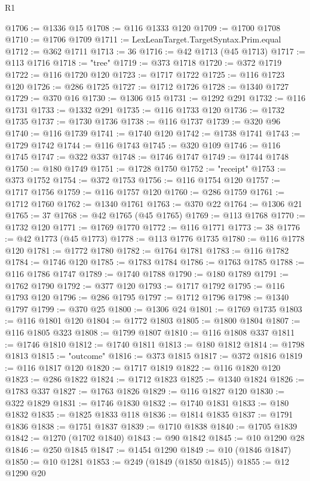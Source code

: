 \begin{lexlean}{R1}
\begin{coremodule}
@1706 := @1336 @15
@1708 := @116 @1333 @120
@1709 := @1700 @1708
@1710 := @1706 @1709
@1711 := LexLeanTarget.TargetSyntax.Prim.equal
@1712 := @362 @1711
@1713 := 36
@1716 := @42 @1713 (@45 @1713)
@1717 := @113 @1716
@1718 := "tree"
@1719 := @373 @1718
@1720 := @372 @1719
@1722 := @116 @1720 @120
@1723 := @1717 @1722
@1725 := @116 @1723 @120
@1726 := @286 @1725
@1727 := @1712 @1726
@1728 := @1340 @1727
@1729 := @370 @16
@1730 := @1306 @15
@1731 := @1292 @291
@1732 := @116 @1731
@1733 := @1332 @291
@1735 := @116 @1733 @120
@1736 := @1732 @1735
@1737 := @1730 @1736
@1738 := @116 @1737
@1739 := @320 @96
@1740 := @116 @1739
@1741 := @1740 @120
@1742 := @1738 @1741
@1743 := @1729 @1742
@1744 := @116 @1743
@1745 := @320 @109
@1746 := @116 @1745
@1747 := @322 @337
@1748 := @1746 @1747
@1749 := @1744 @1748
@1750 := @180 @1749
@1751 := @1728 @1750
@1752 := "receipt"
@1753 := @373 @1752
@1754 := @372 @1753
@1756 := @116 @1754 @120
@1757 := @1717 @1756
@1759 := @116 @1757 @120
@1760 := @286 @1759
@1761 := @1712 @1760
@1762 := @1340 @1761
@1763 := @370 @22
@1764 := @1306 @21
@1765 := 37
@1768 := @42 @1765 (@45 @1765)
@1769 := @113 @1768
@1770 := @1732 @120
@1771 := @1769 @1770
@1772 := @116 @1771
@1773 := 38
@1776 := @42 @1773 (@45 @1773)
@1778 := @113 @1776 @1735
@1780 := @116 @1778 @120
@1781 := @1772 @1780
@1782 := @1764 @1781
@1783 := @116 @1782
@1784 := @1746 @120
@1785 := @1783 @1784
@1786 := @1763 @1785
@1788 := @116 @1786 @1747
@1789 := @1740 @1788
@1790 := @180 @1789
@1791 := @1762 @1790
@1792 := @377 @120
@1793 := @1717 @1792
@1795 := @116 @1793 @120
@1796 := @286 @1795
@1797 := @1712 @1796
@1798 := @1340 @1797
@1799 := @370 @25
@1800 := @1306 @24
@1801 := @1769 @1735
@1803 := @116 @1801 @120
@1804 := @1772 @1803
@1805 := @1800 @1804
@1807 := @116 @1805 @323
@1808 := @1799 @1807
@1810 := @116 @1808 @337
@1811 := @1746 @1810
@1812 := @1740 @1811
@1813 := @180 @1812
@1814 := @1798 @1813
@1815 := "outcome"
@1816 := @373 @1815
@1817 := @372 @1816
@1819 := @116 @1817 @120
@1820 := @1717 @1819
@1822 := @116 @1820 @120
@1823 := @286 @1822
@1824 := @1712 @1823
@1825 := @1340 @1824
@1826 := @1783 @337
@1827 := @1763 @1826
@1829 := @116 @1827 @120
@1830 := @322 @1829
@1831 := @1746 @1830
@1832 := @1740 @1831
@1833 := @180 @1832
@1835 := @1825 @1833 @118
@1836 := @1814 @1835
@1837 := @1791 @1836
@1838 := @1751 @1837
@1839 := @1710 @1838
@1840 := @1705 @1839
@1842 := @1270 (@1702 @1840)
@1843 := @90 @1842
@1845 := @10 @1290 @28
@1846 := @250 @1845
@1847 := @1454 @1290
@1849 := @10 (@1846 @1847)
@1850 := @10 @1281
@1853 := @249 (@1849 (@1850 @1845))
@1855 := @12 @1290 @20

\end{coremodule}
\end{lexlean}
